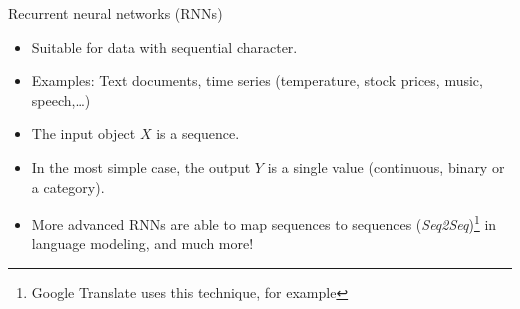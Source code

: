 \documentclass[
  10pt,
  ignorenonframetext,
]{beamer}
\providecommand{\tightlist}{%
  \setlength{\itemsep}{0pt}\setlength{\parskip}{0pt}}
\begin{document}
\begin{frame}{Recurrent neural networks (RNNs)}
\protect\hypertarget{recurrent-neural-networks-rnns}{}
\(~\)

\begin{itemize}
\tightlist
\item
  Suitable for data with sequential character.
\end{itemize}

\vspace{2mm}

\begin{itemize}
\tightlist
\item
  Examples: Text documents, time series (temperature, stock prices,
  music, speech,\ldots)
\end{itemize}

\vspace{2mm}

\begin{itemize}
\tightlist
\item
  The input object \(X\) is a sequence.
\end{itemize}

\vspace{2mm}

\begin{itemize}
\tightlist
\item
  In the most simple case, the output \(Y\) is a single value
  (continuous, binary or a category).
\end{itemize}

\vspace{2mm}

\begin{itemize}
\tightlist
\item
  More advanced RNNs are able to map sequences to sequences
  (\emph{Seq2Seq})\footnote{Google Translate uses this technique, for example}
  in language modeling, and much more!
\end{itemize}
\end{frame}
\end{document}
